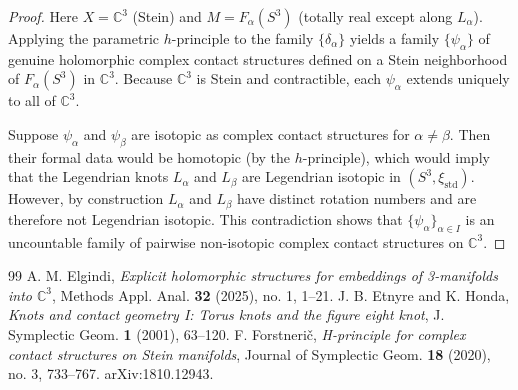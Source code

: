 \documentclass[10pt,a4paper]{amsart}
\newcommand{\C}{\mathbb{C}}
\begin{document}
\begin{proof}
Here $X=\mathbb{C}^3$ (Stein) and $M = F_\alpha(S^3)$ (totally real except along $L_\alpha$). 
Applying the parametric $h$-principle to the family $\{\delta_\alpha\}$ yields a family $\{\psi_\alpha\}$ of genuine holomorphic complex contact structures 
defined on a Stein neighborhood of $F_\alpha(S^3)$ in $\mathbb{C}^3$. 
Because $\mathbb{C}^3$ is Stein and contractible, each $\psi_\alpha$ extends uniquely to all of $\mathbb{C}^3$.

\medskip
Suppose $\psi_\alpha$ and $\psi_\beta$ are isotopic as complex contact structures for $\alpha\neq\beta$. 
Then their formal data would be homotopic (by the $h$-principle), which would imply that the Legendrian knots $L_\alpha$ and $L_\beta$ 
are Legendrian isotopic in $(S^3,\xi_{\mathrm{std}})$. 
However, by construction $L_\alpha$ and $L_\beta$ have distinct rotation numbers and are therefore not Legendrian isotopic. 
This contradiction shows that $\{\psi_\alpha\}_{\alpha\in I}$ is an uncountable family of pairwise non-isotopic complex contact structures on $\mathbb{C}^3$.
\end{proof}


\begin{thebibliography}{99}
 A. M. Elgindi, \textit{Explicit holomorphic structures for embeddings of 3-manifolds into $\C^3$}, Methods Appl. Anal. \textbf{32} (2025), no. 1, 1–21.
 J. B. Etnyre and K. Honda, \textit{Knots and contact geometry I: Torus knots and the figure eight knot}, J. Symplectic Geom. \textbf{1} (2001), 63–120.
 F. Forstnerič, \emph{H-principle for complex contact structures on Stein manifolds}, Journal of Symplectic Geom. \textbf{18} (2020), no. 3, 733–767. arXiv:1810.12943.
\end{thebibliography}
\end{document}

